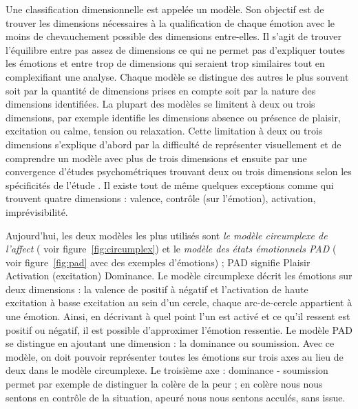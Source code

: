\documentclass[a4paper,12pt]{report}
\begin{document}
Une classification dimensionnelle est appelée un modèle. Son objectif est de trouver les dimensions nécessaires à la qualification de chaque émotion avec le moins de chevauchement possible des dimensions entre-elles. Il s'agit de trouver l'équilibre entre pas assez de dimensions ce qui ne permet pas d'expliquer toutes les émotions et entre trop de dimensions qui seraient trop similaires tout en complexifiant une analyse. Chaque modèle se distingue des autres le plus souvent soit par la quantité de dimensions prises en compte soit par la nature des dimensions identifiées. La plupart des modèles se limitent à deux ou trois dimensions, par exemple \textcite{wundt1897} identifie les dimensions absence ou présence de plaisir, excitation ou calme, tension ou relaxation. Cette limitation à deux ou trois dimensions s'explique d'abord par la difficulté de représenter visuellement et de comprendre un modèle avec plus de trois dimensions et ensuite par une convergence d'études psychométriques trouvant deux ou trois dimensions selon les spécificités de l'étude \parencites{osgood66, schlosberg54, abelson62, gladstones62, williams65}. Il existe tout de même quelques exceptions comme \textcite{fontaine07} qui trouvent quatre dimensions : valence, contrôle (sur l'émotion), activation, imprévisibilité. \par


Aujourd'hui, les deux modèles les plus utilisés \parencite{wang22} sont \textit{le modèle circumplexe de l'affect} (\textcite{russell80} voir figure~\ref{fig:circumplex}) et le \textit{modèle des états émotionnels PAD} (\textcite{mehrabian74} voir figure~\ref{fig:pad} avec des exemples d'émotions) ; PAD signifie Plaisir Activation (excitation) Dominance. Le modèle circumplexe décrit les émotions sur deux dimensions : la valence de positif à négatif et l'activation de haute excitation à basse excitation au sein d'un cercle, chaque arc-de-cercle appartient à une émotion. Ainsi, en décrivant à quel point l'un est activé et ce qu'il ressent est positif ou négatif, il est possible d'approximer l'émotion ressentie. Le modèle PAD se distingue en ajoutant une dimension : la dominance ou soumission. Avec ce modèle, on doit pouvoir représenter toutes les émotions sur trois axes au lieu de deux dans le modèle circumplexe. Le troisième axe : dominance - soumission permet par exemple de distinguer la colère de la peur ; en colère nous nous sentons en contrôle de la situation, apeuré nous nous sentons acculés, sans issue. \par 
\end{document}

